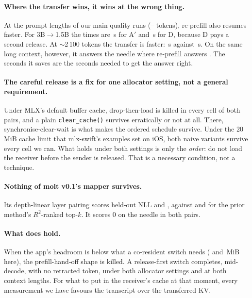 \paragraph{Where the transfer wins, it wins at the wrong thing.}
At the prompt lengths of our main quality runs (-- tokens), re-prefill also resumes faster.
For 3B$\to$1.5B the times are \,s for A$'$ and \,s for D, because D pays a second release.
At $\sim$2\,100 tokens the transfer is faster: \,s against \,s.
On the same long context, however, it answers the needle  where re-prefill answers .
The seconds it saves are the seconds needed to get the answer right.

\paragraph{The careful release is a fix for one allocator setting, not a general requirement.}
Under MLX's default buffer cache, drop-then-load is killed in every cell of both pairs, and a plain \texttt{clear\_cache()} survives erratically or not at all.
There, synchronise-clear-wait is what makes the ordered schedule survive.
Under the 20\,MiB cache limit that mlx-swift's examples set on iOS, both naive variants survive every cell we ran.
What holds under both settings is only the \emph{order}: do not load the receiver before the sender is released.
That is a necessary condition, not a technique.

\paragraph{Nothing of molt v0.1's mapper survives.}
Its depth-linear layer pairing scores held-out NLL  and , against  and  for the prior method's $R^2$-ranked top-$k$.
It scores 0 on the needle in both pairs.

\paragraph{What does hold.}
When the app's headroom is below what a co-resident switch needs ( and \,MiB here), the prefill-hand-off shape is killed.
A release-first switch completes, mid-decode, with no retracted token, under both allocator settings and at both context lengths.
For what to put in the receiver's cache at that moment, every measurement we have favours the transcript over the transferred KV.
